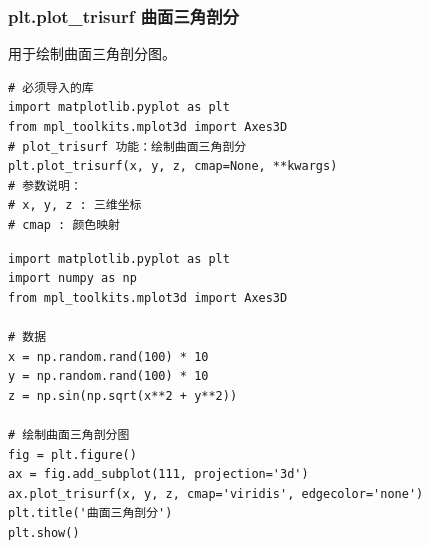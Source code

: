\subsubsection{plt.plot\_trisurf 曲面三角剖分}
 用于绘制曲面三角剖分图。
\begin{lstlisting}[style=demostyle,numbers=none]
# 必须导入的库
import matplotlib.pyplot as plt
from mpl_toolkits.mplot3d import Axes3D
# plot_trisurf 功能：绘制曲面三角剖分
plt.plot_trisurf(x, y, z, cmap=None, **kwargs)
# 参数说明：
# x, y, z : 三维坐标
# cmap : 颜色映射
\end{lstlisting}
\begin{lstlisting}[style=pythonstyle]
import matplotlib.pyplot as plt
import numpy as np
from mpl_toolkits.mplot3d import Axes3D

# 数据
x = np.random.rand(100) * 10
y = np.random.rand(100) * 10
z = np.sin(np.sqrt(x**2 + y**2))

# 绘制曲面三角剖分图
fig = plt.figure()
ax = fig.add_subplot(111, projection='3d')
ax.plot_trisurf(x, y, z, cmap='viridis', edgecolor='none')
plt.title('曲面三角剖分')
plt.show()
\end{lstlisting}

